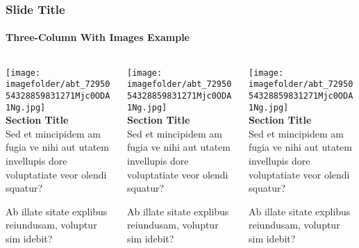 \documentclass[
	aspectratio=169, %
	t, %
	onlytextwidth, %
	10pt, %
]{beamer}
\def\imagefolder{../ImperialTheme/Images/}
\begin{document}
\begin{frame}
	\frametitle{Slide Title}
	\framesubtitle{Three-Column With Images Example}
	
	\small %
	
	\begin{columns}[T] %
		\begin{column}{0.3\linewidth} %
			\texttt{[image: \\imagefolder/abt\_7295054328859831271Mjc0ODA1Ng.jpg]}\\[3pt]
			\textbf{Section Title}\\			
			Sed et mincipidem am fugia ve nihi aut utatem invellupis dore voluptatiate veor olendi squatur?
	
			Ab illate sitate explibus reiundusam, voluptur sim idebit?
		\end{column}
		\begin{column}{0.3\linewidth} %
			\texttt{[image: \\imagefolder/abt\_7295054328859831271Mjc0ODA1Ng.jpg]}\\[3pt]
			\textbf{Section Title}\\			
			Sed et mincipidem am fugia ve nihi aut utatem invellupis dore voluptatiate veor olendi squatur?
	
			Ab illate sitate explibus reiundusam, voluptur sim idebit?
		\end{column}
		\begin{column}{0.3\linewidth} %
			\texttt{[image: \\imagefolder/abt\_7295054328859831271Mjc0ODA1Ng.jpg]}\\[3pt]
			\textbf{Section Title}\\			
			Sed et mincipidem am fugia ve nihi aut utatem invellupis dore voluptatiate veor olendi squatur?
	
			Ab illate sitate explibus reiundusam, voluptur sim idebit?
		\end{column}
	\end{columns}
\end{frame}

\end{document}
